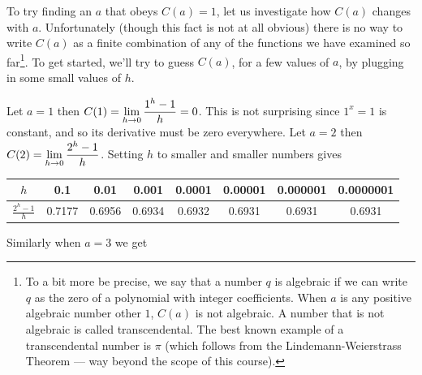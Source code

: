 To try finding an $a$ that obeys $C(a)=1$, let us investigate how $C(a)$ changes
with
$a$. Unfortunately (though this fact is not at all obvious) there is no way to
write
$C(a)$ as a finite combination of any of the functions we have examined
so far\footnote{To a bit more be precise, we say that a number $q$ is algebraic
if we can
write $q$ as the zero of a polynomial with integer coefficients. When $a$ is any
positive
algebraic number other $1$, $C(a)$ is not algebraic. A number that is not
algebraic is
called transcendental. The best known example of a transcendental number is
$\pi$ (which
follows from the Lindemann-Weierstrass Theorem --- way beyond the scope of this
course).}. To get started, we'll try to guess $C(a)$, for a few values of
$a$, by plugging in some small values of $h$.
\begin{eg}\label{eg log est}
Let $a =1$ then $C(1) = \displaystyle \lim_{h \to 0} \frac{1^h-1}{h} = 0$. This is not
surprising
since $1^x=1$ is constant, and so its derivative must be zero everywhere. Let $a
=2$
then $C(2) = \displaystyle \lim_{h \to 0} \frac{2^h-1}{h}$. Setting $h$ to smaller and
smaller
numbers gives
\begin{center}
   \renewcommand{\arraystretch}{1.2}
   \begin{tabular}{|c||c|c|c|c|c|c|c|}
       \hline
       $h$ & 0.1 & 0.01 & 0.001 & 0.0001 & 0.00001 & 0.000001 & 0.0000001 \\
       \hline
       $\tfrac{2^h-1}{h}$ & 0.7177 & 0.6956 & 0.6934 & 0.6932 &
             0.6931 & 0.6931 & 0.6931 \\ \hline
     \end{tabular}
     \renewcommand{\arraystretch}{1.0}
\end{center}
Similarly when $a=3$ we get

\end{eg}
